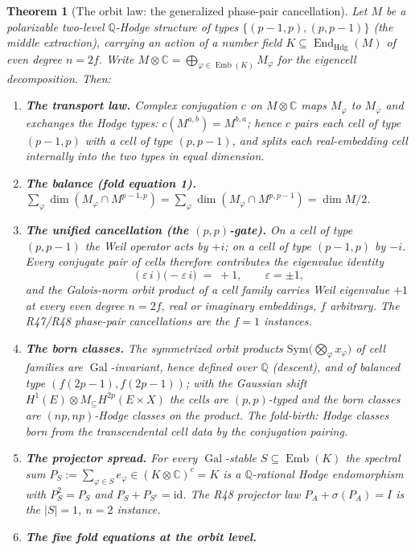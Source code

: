 \documentclass[11pt]{article}
\newcommand{\C}{\mathbb C}
\newcommand{\Q}{\mathbb Q}
\newcommand{\End}{\operatorname{End}}
\newcommand{\Hdg}{\operatorname{Hdg}}
\newcommand{\Emb}{\operatorname{Emb}}
\newcommand{\Gal}{\operatorname{Gal}}
\newtheorem{theorem}{Theorem}[section]
\begin{document}
\begin{theorem}[The orbit law: the generalized phase-pair cancellation]
\label{th:orbit}
Let $M$ be a polarizable two-level $\Q$-Hodge structure of types
$\{(p-1,p),(p,p-1)\}$ (the middle extraction), carrying an action of a
number field $K\subseteq\End_{\Hdg}(M)$ of even degree $n=2f$. Write
$M\otimes\C=\bigoplus_{\varphi\in\Emb(K)}M_\varphi$ for the eigencell
decomposition. Then:
\begin{enumerate}[label=(\roman*)]
\item \textbf{The transport law.} Complex conjugation $c$ on
$M\otimes\C$ maps $M_\varphi$ to $M_{\bar\varphi}$ and exchanges the
Hodge types: $c(M^{a,b})=M^{b,a}$; hence $c$ pairs each cell of type
$(p-1,p)$ with a cell of type $(p,p-1)$, and splits each
real-embedding cell internally into the two types in equal dimension.
\item \textbf{The balance (fold equation 1).}
$\sum_\varphi\dim(M_\varphi\cap M^{p-1,p})=\sum_\varphi
\dim(M_\varphi\cap M^{p,p-1})=\dim M/2$.
\item \textbf{The unified cancellation (the $(p,p)$-gate).} On a cell
of type $(p,p-1)$ the Weil operator acts by $+i$; on a cell of type
$(p-1,p)$ by $-i$. Every conjugate pair of cells therefore contributes
the eigenvalue identity
\[
(\varepsilon\, i)\bigl(-\varepsilon\, i\bigr) \;=\; +1,
\qquad \varepsilon=\pm1,
\]
and the Galois-norm orbit product of a cell family carries Weil
eigenvalue $+1$ at \emph{every} even degree $n=2f$, real or imaginary
embeddings, $f$ arbitrary. The R47/R48 phase-pair cancellations are the
$f=1$ instances.
\item \textbf{The born classes.} The symmetrized orbit products
$\mathrm{Sym}\bigl(\bigotimes_\varphi x_\varphi\bigr)$ of cell
families are $\Gal$-invariant, hence defined over $\Q$ (descent), and
of balanced type $(f(2p-1),f(2p-1))$; with the Gaussian shift
$H^1(E)\otimes M_\subseteq H^{2p}(E\times X)$ the cells are
$(p,p)$-typed and the born classes are $(np,np)$-Hodge classes on the
product. \emph{The fold-birth: Hodge classes born from the
transcendental cell data by the conjugation pairing.}
\item \textbf{The projector spread.} For every
$\Gal$-stable $S\subseteq\Emb(K)$ the spectral sum
$P_S:=\sum_{\varphi\in S}e_\varphi\in(K\otimes\C)^{c}=K$ is a
$\Q$-rational Hodge endomorphism with $P_S^2=P_S$ and
$P_S+P_{S^c}=\mathrm{id}$. The R48 projector law
$P_A+\sigma(P_A)=I$ is the $|S|=1$, $n=2$ instance.
\item \textbf{The five fold equations at the orbit level.}

\end{enumerate}
\end{theorem}
\end{document}

